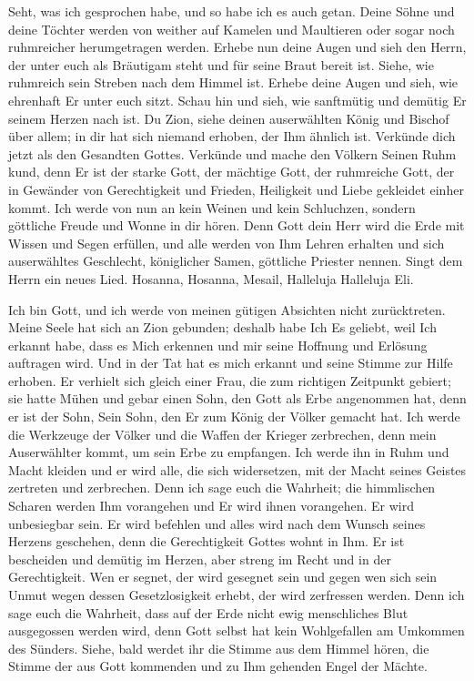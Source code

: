        Seht, was ich gesprochen habe, und so habe ich es auch getan. Deine Söhne und deine Töchter werden von weither auf Kamelen und Maultieren oder sogar noch ruhmreicher herumgetragen werden. Erhebe nun deine Augen und sieh den Herrn, der unter euch als Bräutigam steht und für seine Braut bereit ist. Siehe, wie ruhmreich sein Streben nach dem Himmel ist. Erhebe deine Augen und sieh, wie ehrenhaft Er unter euch sitzt. Schau hin und sieh, wie sanftmütig und demütig Er seinem Herzen nach ist. Du Zion, siehe deinen auserwählten König und Bischof über allem; in dir hat sich niemand erhoben, der Ihm ähnlich ist. Verkünde dich jetzt als den Gesandten Gottes. Verkünde und mache den Völkern Seinen Ruhm kund, denn Er ist der starke Gott, der mächtige Gott, der ruhmreiche Gott, der in Gewänder von Gerechtigkeit und Frieden, Heiligkeit und Liebe gekleidet einher kommt. Ich werde von nun an kein Weinen und kein Schluchzen, sondern göttliche Freude und Wonne in dir hören. Denn Gott dein Herr wird die Erde mit Wissen und Segen erfüllen, und alle werden von Ihm Lehren erhalten und sich auserwähltes Geschlecht, königlicher Samen, göttliche Priester nennen. Singt dem Herrn ein neues Lied. Hosanna, Hosanna, Mesail, Halleluja Halleluja Eli. 
        
        Ich bin Gott, und ich werde von meinen gütigen Absichten nicht zurücktreten. Meine Seele hat sich an Zion gebunden; deshalb habe Ich Es geliebt, weil Ich erkannt habe, dass es Mich erkennen und mir seine Hoffnung und Erlösung auftragen wird. Und in der Tat hat es mich erkannt und seine Stimme zur Hilfe erhoben. Er verhielt sich gleich einer Frau, die zum richtigen Zeitpunkt gebiert; sie hatte Mühen und gebar einen Sohn, den Gott als Erbe angenommen hat, denn er ist der Sohn, Sein Sohn, den Er zum König der Völker gemacht hat. Ich werde die Werkzeuge der Völker und die Waffen der Krieger zerbrechen, denn mein Auserwählter kommt, um sein Erbe zu empfangen. Ich werde ihn in Ruhm und Macht kleiden und er wird alle, die sich widersetzen, mit der Macht seines Geistes zertreten und zerbrechen. Denn ich sage euch die Wahrheit; die himmlischen Scharen werden Ihm vorangehen und Er wird ihnen vorangehen. Er wird unbesiegbar sein. Er wird befehlen und alles wird nach dem Wunsch seines Herzens geschehen, denn die Gerechtigkeit Gottes wohnt in Ihm. Er ist bescheiden und demütig im Herzen, aber streng im Recht und in der Gerechtigkeit. Wen er segnet, der wird gesegnet sein und gegen wen sich sein Unmut wegen dessen Gesetzlosigkeit erhebt, der wird zerfressen werden. Denn ich sage euch die Wahrheit, dass auf der Erde nicht ewig menschliches Blut ausgegossen werden wird, denn Gott selbst hat kein Wohlgefallen am Umkommen des Sünders. Siehe, bald werdet ihr die Stimme aus dem Himmel hören, die Stimme der aus Gott kommenden und zu Ihm gehenden Engel der Mächte.
        
